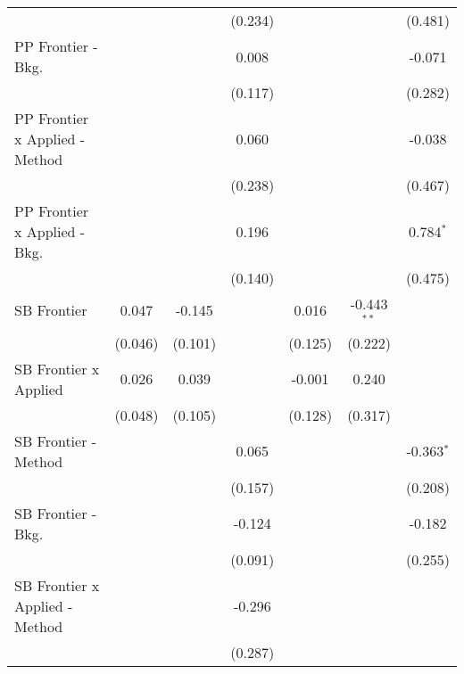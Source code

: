 \begin{tabular}{lcccccc}
                                  &               &         & (0.234) &               &               & (0.481)\\   
   PP Frontier - Bkg.             &               &         & 0.008   &               &               & -0.071\\   
                                  &               &         & (0.117) &               &               & (0.282)\\   
   PP Frontier x Applied - Method &               &         & 0.060   &               &               & -0.038\\   
                                  &               &         & (0.238) &               &               & (0.467)\\   
   PP Frontier x Applied - Bkg.   &               &         & 0.196   &               &               & 0.784$^{*}$\\   
                                  &               &         & (0.140) &               &               & (0.475)\\   
   SB Frontier                    & 0.047         & -0.145  &         & 0.016         & -0.443$^{**}$ &   \\   
                                  & (0.046)       & (0.101) &         & (0.125)       & (0.222)       &   \\   
   SB Frontier x Applied          & 0.026         & 0.039   &         & -0.001        & 0.240         &   \\   
                                  & (0.048)       & (0.105) &         & (0.128)       & (0.317)       &   \\   
   SB Frontier - Method           &               &         & 0.065   &               &               & -0.363$^{*}$\\   
                                  &               &         & (0.157) &               &               & (0.208)\\   
   SB Frontier - Bkg.             &               &         & -0.124  &               &               & -0.182\\   
                                  &               &         & (0.091) &               &               & (0.255)\\   
   SB Frontier x Applied - Method &               &         & -0.296  &               &               &   \\   
                                  &               &         & (0.287) &               &               &   \\   

\end{tabular}
